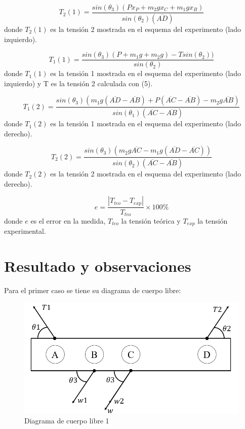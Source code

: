 \documentclass[a4paper]{article}
\begin{document}
\begin{equation}
    T_2(1)=\frac{sin(\theta_3)(P x_P+m_2 g x_C +m_1 g x_B)}{sin(\theta_2)(\overline{AD})}
\end{equation}
donde $T_2(1)$ es la tensión 2 mostrada en el esquema del experimento (lado izquierdo).

\begin{equation}
    T_1(1)=\frac{sin(\theta_3)(P+m_1 g+m_2 g)-T sin(\theta_2))}{sin(\theta_2)}
\end{equation}
donde $T_1(1)$ es la tensión 1 mostrada en el esquema del experimento (lado izquierdo) y T es la tensión 2 calculada con (5).

\begin{equation}
    T_1(2)=\frac{sin(\theta_3)(m_1g(\overline{AD}-\overline{AB})+P(\overline{AC}-\overline{AB})-m_2g \overline{AB})}{sin(\theta_1)(\overline{AC}-\overline{AB})}
\end{equation}
donde $T_1(2)$ es la tensión 1 mostrada en el esquema del experimento (lado derecho).

\begin{equation}
    T_2(2)=\frac{sin(\theta_3)(m_2g\overline{AC}-m_1g(\overline{AD}-\overline{AC}))}{sin(\theta_2)(\overline{AC}-\overline{AB})}
\end{equation}
donde $T_2(2)$ es la tensión 2 mostrada en el esquema del experimento (lado derecho).

\begin{equation}
    e=\frac{|T_{teo}-T_{exp}|}{T_{teo}} \times 100\%
\end{equation}
donde $e$ es el error en la medida, $T_{teo}$ la tensión teórica y $T_{exp}$ la tensión experimental.

\section{Resultado y observaciones}

Para el primer caso se tiene su diagrama de cuerpo libre:
\begin{figure} [H]
    \centering
    \includegraphics[width=0.6 \textwidth]{Diagrama de cuerpo libre 1.png}
    \caption{Diagrama de cuerpo libre 1}
    \end{figure}
\end{document}
